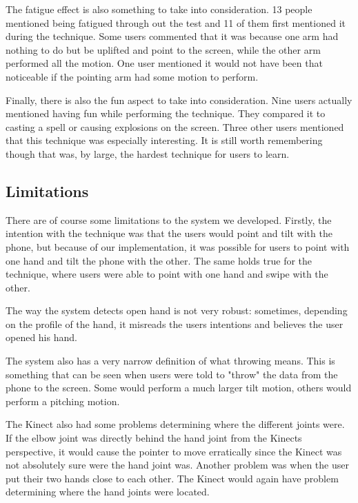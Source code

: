The fatigue effect is also something to take into consideration. 13 people mentioned being fatigued through out the test and 11 of them first mentioned it during the \throw technique.
Some users commented that it was because one arm had nothing to do but be uplifted and point to the screen, while the other arm performed all the motion.
One user mentioned it would not have been that noticeable if the pointing arm had some motion to perform. 

Finally, there is also the fun aspect to take into consideration. Nine users actually mentioned having fun while performing the \pinch technique. 
They compared it to casting a spell or causing explosions on the screen. Three other users mentioned that this technique was especially interesting. 
It is still worth remembering though that \pinch was, by large, the hardest technique for users to learn. 



\subsection{Limitations}
There are of course some limitations to the system we developed. 
Firstly, the intention with the \tilt technique was that the users would point and tilt with the phone, but because of our implementation, it was possible for users to point with one hand and tilt the phone with the other.
The same holds true for the \swipe technique, where users were able to point with one hand and swipe with the other.

The way the system detects open hand is not very robust: sometimes, depending on the profile of the hand, it misreads the users intentions and believes the user opened his hand. 

The system also has a very narrow definition of what throwing means. 
This is something that can be seen when users were told to "throw" the data from the phone to the screen.
Some would perform a much larger tilt motion, 
others would perform a pitching motion. 

The Kinect also had some problems determining where the different joints were.
If the elbow joint was directly behind the hand joint from the Kinects perspective, it would cause the pointer to move erratically since the Kinect was not absolutely sure were the hand joint was.
Another problem was when the user put their two hands close to each other. 
The Kinect would again have problem determining where the hand joints were located. 
